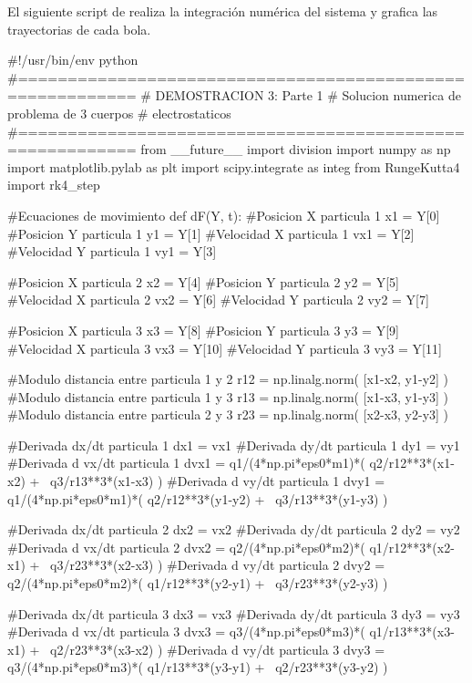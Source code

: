 El siguiente script de \python realiza la integración numérica del sistema
y grafica las trayectorias de cada bola.


\begin{listing}[style=python]
#!/usr/bin/env python
#==========================================================
# DEMOSTRACION 3: Parte 1
# Solucion numerica de problema de 3 cuerpos 
# electrostaticos
#==========================================================
from __future__ import division
import numpy as np
import matplotlib.pylab as plt
import scipy.integrate as integ
from RungeKutta4 import rk4_step

#Ecuaciones de movimiento
def dF(Y, t):
    #Posicion X particula 1
    x1 = Y[0]
    #Posicion Y particula 1
    y1 = Y[1]
    #Velocidad X particula 1
    vx1 = Y[2]
    #Velocidad Y particula 1
    vy1 = Y[3]
    
    #Posicion X particula 2
    x2 = Y[4]
    #Posicion Y particula 2
    y2 = Y[5]
    #Velocidad X particula 2
    vx2 = Y[6]
    #Velocidad Y particula 2
    vy2 = Y[7]
    
    #Posicion X particula 3
    x3 = Y[8]
    #Posicion Y particula 3
    y3 = Y[9]
    #Velocidad X particula 3
    vx3 = Y[10]
    #Velocidad Y particula 3
    vy3 = Y[11]
    
    #Modulo distancia entre particula 1 y 2
    r12 = np.linalg.norm( [x1-x2, y1-y2] )
    #Modulo distancia entre particula 1 y 3
    r13 = np.linalg.norm( [x1-x3, y1-y3] )
    #Modulo distancia entre particula 2 y 3
    r23 = np.linalg.norm( [x2-x3, y2-y3] )
    
    #Derivada dx/dt particula 1
    dx1 = vx1
    #Derivada dy/dt particula 1
    dy1 = vy1
    #Derivada d vx/dt particula 1
    dvx1 = q1/(4*np.pi*eps0*m1)*( q2/r12**3*(x1-x2) + \
    q3/r13**3*(x1-x3) )
    #Derivada d vy/dt particula 1
    dvy1 = q1/(4*np.pi*eps0*m1)*( q2/r12**3*(y1-y2) + \
    q3/r13**3*(y1-y3) )
    
    #Derivada dx/dt particula 2
    dx2 = vx2
    #Derivada dy/dt particula 2
    dy2 = vy2
    #Derivada d vx/dt particula 2
    dvx2 = q2/(4*np.pi*eps0*m2)*( q1/r12**3*(x2-x1) + \
    q3/r23**3*(x2-x3) )
    #Derivada d vy/dt particula 2
    dvy2 = q2/(4*np.pi*eps0*m2)*( q1/r12**3*(y2-y1) + \
    q3/r23**3*(y2-y3) )
    
    #Derivada dx/dt particula 3
    dx3 = vx3
    #Derivada dy/dt particula 3
    dy3 = vy3
    #Derivada d vx/dt particula 3
    dvx3 = q3/(4*np.pi*eps0*m3)*( q1/r13**3*(x3-x1) + \
    q2/r23**3*(x3-x2) )
    #Derivada d vy/dt particula 3
    dvy3 = q3/(4*np.pi*eps0*m3)*( q1/r13**3*(y3-y1) + \
    q2/r23**3*(y3-y2) )


\end{listing}
